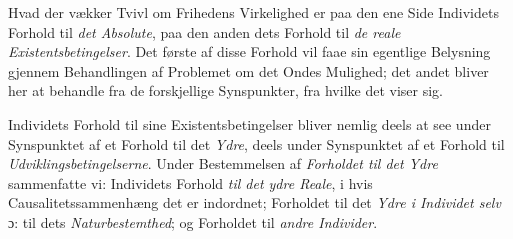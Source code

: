 Hvad der vækker Tvivl om Frihedens Virkelighed er paa den ene Side Individets
Forhold til \emph{det Absolute},
 paa den anden dets Forhold til \emph{de reale Existentsbetingelser}. Det første
af disse Forhold vil faae sin egentlige Belysning gjennem Behandlingen af
Problemet om det Ondes Mulighed; det andet bliver her at behandle fra de
forskjellige Synspunkter, fra hvilke det viser sig.

Individets Forhold til sine Existentsbetingelser bliver nemlig deels at see under
Synspunktet af et Forhold til det \emph{Ydre}, deels under Synspunktet af et
Forhold til \emph{Udviklingsbetingelserne}. Under Bestemmelsen af \emph{Forholdet
til det Ydre} sammenfatte vi: Individets Forhold \emph{til det ydre Reale}, i
hvis Causalitetssammenhæng det er indordnet; Forholdet til det \emph{Ydre i
Individet selv} ɔ: til dets \emph{Naturbestemthed}; og Forholdet til \emph{andre
Individer}.

